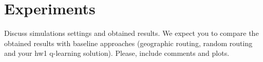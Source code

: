\section{Experiments}
Discuss simulations settings and obtained results.
We expect you to compare the obtained results with baseline approaches (geographic routing, random routing and your hw1 q-learning solution). 
Please, include comments and plots.
